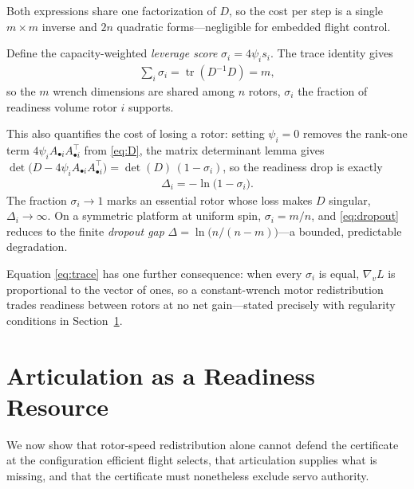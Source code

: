 \documentclass[letter, 10 pt, journal, twoside]{IEEEtran}
\theoremstyle{compact}
\begin{document}
Both expressions share one factorization of $D$, so the cost per step is a single $m\times m$ inverse and $2n$ quadratic forms---negligible for embedded flight control. 

Define the capacity-weighted \emph{leverage score} $\sigma_i = 4\psi_i s_i$. The trace identity gives
%
\begin{align}
    \textstyle\sum_i \sigma_i = \operatorname{tr}(D^{-1}D) = m,
    \label{eq:trace}
\end{align}
%
so the $m$ wrench dimensions are shared among $n$ rotors, $\sigma_i$ the fraction of readiness volume rotor $i$ supports.
 
This also quantifies the cost of losing a rotor: setting $\psi_i=0$ removes the rank-one term $4\psi_i A_{\bullet i}A_{\bullet i}^{\!\top}$ from \eqref{eq:D}, the matrix determinant lemma %
gives $\det\big(D-4\psi_iA_{\bullet i}A_{\bullet i}^{\!\top}\big)=\det(D)\,(1-\sigma_i)$, so the readiness drop is exactly
%
\begin{align}
    \Delta_i = -\ln\big(1-\sigma_i\big).
    \label{eq:dropout}
\end{align}
%
The fraction $\sigma_i\!\to\!1$ marks an essential rotor whose loss makes $D$ singular, $\Delta_i\!\to\!\infty$. On a symmetric platform at uniform spin, $\sigma_i=m/n$, and \eqref{eq:dropout} reduces to the finite \emph{dropout gap} $\Delta=\ln\!\big(n/(n-m)\big)$---a bounded, predictable degradation.%
 
Equation \eqref{eq:trace} has one further consequence: when every $\sigma_i$ is equal, $\nabla_v L$ is proportional to the vector of ones, so a constant-wrench motor redistribution trades readiness between rotors at no net gain---stated precisely with regularity conditions in Section~\ref{sec:art}.



\section{Articulation as a Readiness Resource}
\label{sec:art}

We now show that rotor-speed redistribution alone cannot defend the certificate at the configuration efficient flight selects, that articulation supplies what is missing, and that the certificate must nonetheless exclude servo authority. %
\end{document}
